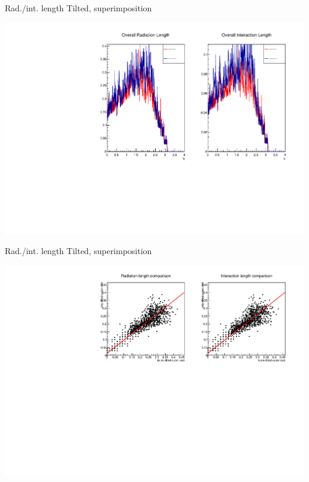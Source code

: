 \documentclass[pdftex, 11pt]{beamer}
\begin{document}
\begin{frame}{Rad./int. length Tilted, superimposition}
  \begin{center}
    \includegraphics[width=\textwidth]{img/outer-tilted-superimposition.pdf}
  \end{center}
\end{frame}

\begin{frame}{Rad./int. length Tilted, superimposition}
  \begin{center}
    \includegraphics[width=\textwidth]{img/outer-tilted-scattering.pdf}
  \end{center}
\end{frame}
\end{document}
